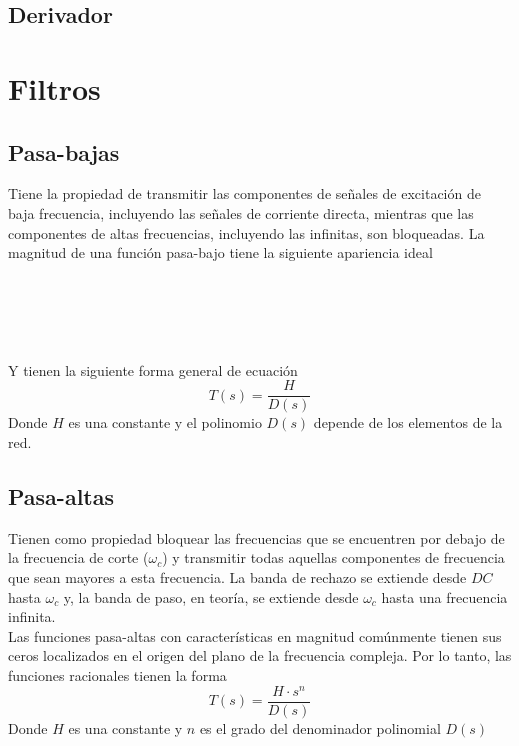 \documentclass[12pt,spanish,lettersize]{article}
\begin{document}
\subsection{Derivador}

\section{Filtros}

\subsection{Pasa-bajas}
Tiene la propiedad de transmitir las componentes de se\~nales de excitaci\'on de baja frecuencia, incluyendo las se\~nales de corriente directa, mientras que las componentes de  altas frecuencias, incluyendo  las  infinitas, son bloqueadas. La magnitud de una funci\'on pasa-bajo tiene la siguiente apariencia ideal\\
\\ \\ \\ \\ \\
Y tienen la siguiente forma general de ecuaci\'on
\begin{equation}
T(s)=\frac{H}{D(s)}
\end{equation}
Donde $H$ es una constante y el polinomio $D(s)$ depende de los elementos de la red.
\subsection{Pasa-altas}
Tienen como propiedad bloquear las frecuencias que se encuentren por debajo  de la  frecuencia  de  corte ($\omega_{c}$) y  transmitir  todas  aquellas  componentes  de  frecuencia  que  sean mayores a esta frecuencia. La banda de rechazo se extiende desde $DC$ hasta $\omega_{c}$ y, la banda de paso, en teoría,  se extiende desde $\omega_{c}$ hasta una frecuencia infinita.\\
Las  funciones  pasa-altas  con  caracter\'isticas  en  magnitud  com\'unmente  tienen  sus  ceros 
localizados  en  el  origen  del  plano  de  la  frecuencia  compleja.  Por  lo  tanto,  las  funciones 
racionales tienen la forma
\begin{equation}
T(s)=\frac{H\cdot s^{n}}{D(s)}
\end{equation}
Donde $H$ es una constante y $n$ es el grado del denominador polinomial $D(s)$
\end{document}
